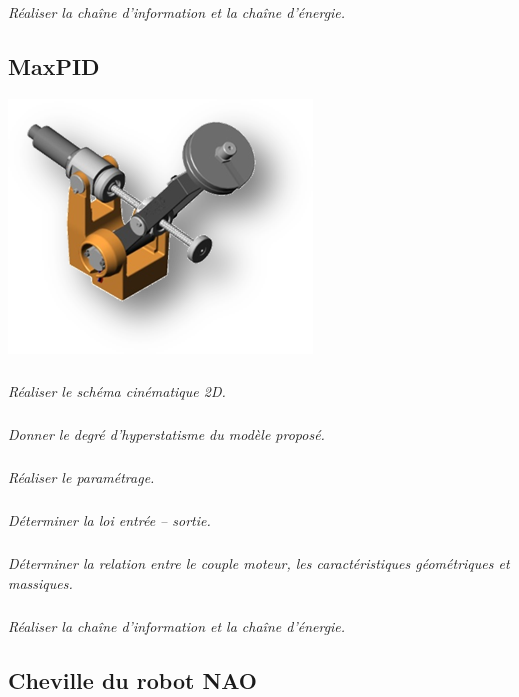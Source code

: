\documentclass[10pt,fleqn]{article} %
\begin{document}
\begin{multicols}{2}
\subparagraph{}
\textit{Réaliser la chaîne d'information et la chaîne d'énergie.}


\subsection*{MaxPID}


\setcounter{exo}{0}
\begin{center}
\includegraphics[width=\linewidth]{images/maxpid_01}
\end{center}

\subparagraph{}
\textit{Réaliser le schéma cinématique 2D.}

\subparagraph{}
\textit{Donner le degré d’hyperstatisme du modèle proposé.}


\subparagraph{}
\textit{Réaliser le paramétrage.}


\subparagraph{}
\textit{Déterminer la loi entrée -- sortie.}

\subparagraph{}
\textit{Déterminer la relation entre le couple moteur, les caractéristiques géométriques et massiques. }


\subparagraph{}
\textit{Réaliser la chaîne d'information et la chaîne d'énergie.}

\subsection*{Cheville du robot NAO}



\end{multicols}
\end{document}
